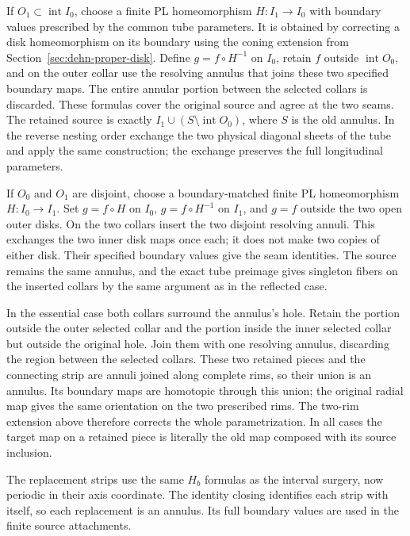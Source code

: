 If $O_1\subset\operatorname{int}I_0$, choose a finite PL
homeomorphism $H:I_1\to I_0$ with boundary values prescribed by
the common tube parameters.  It is obtained by correcting a disk
homeomorphism on its boundary using the coning extension from
Section~\ref{sec:dehn-proper-disk}.  Define $g=f\circ H^{-1}$ on
$I_0$, retain $f$ outside $\operatorname{int}O_0$, and on the outer
collar use the resolving annulus that joins these two specified
boundary maps.  The entire annular portion between the selected
collars is discarded.  These formulas cover the original source
and agree at the two seams.  The retained source is exactly
$I_1\cup(S\setminus\operatorname{int}O_0)$, where $S$ is the old
annulus.  In the reverse nesting order exchange the two physical
diagonal sheets of the tube and apply the same construction;
the exchange preserves the full longitudinal parameters.

If $O_0$ and $O_1$ are disjoint, choose a boundary-matched finite PL
homeomorphism $H:I_0\to I_1$.  Set $g=f\circ H$ on $I_0$,
$g=f\circ H^{-1}$ on $I_1$, and $g=f$ outside the two open outer
disks.  On the two collars insert the two disjoint resolving annuli.
This exchanges the two inner disk maps once each; it does not make
two copies of either disk.  Their specified boundary values give
the seam identities.  The source remains the same annulus, and
the exact tube preimage gives singleton fibers on the inserted
collars by the same argument as in the reflected case.

In the essential case both collars surround the annulus's hole.
Retain the portion outside the outer selected collar and the portion
inside the inner selected collar but outside the original hole.
Join them with one resolving annulus, discarding the region between
the selected collars.  These two retained pieces and the connecting
strip are annuli joined along complete rims, so their union is an
annulus.  Its boundary maps are homotopic through this union; the
original radial map gives the same orientation on the two prescribed
rims.  The two-rim extension above therefore corrects the whole
parametrization.  In all cases the target map on a retained piece
is literally the old map composed with its source inclusion.

The replacement strips use the same $H_b$ formulas as the interval
surgery, now periodic in their axis coordinate.  The identity closing
identifies each strip with itself, so each replacement is an annulus.
Its full boundary values are used in the finite source attachments.


